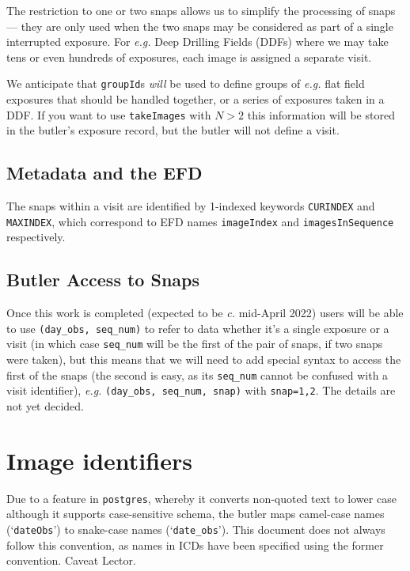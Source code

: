 \documentclass[SE,authoryear,toc]{lsstdoc}
\renewcommand{\eg}{\textit{e.g.}\xspace}
\begin{document}
The restriction to one or two snaps allows us to simplify the
processing of snaps --- they are only used when the two snaps may be considered as part
of a single interrupted exposure. For \eg Deep Drilling Fields (DDFs) where we may take tens
or even hundreds of exposures, each image is assigned a separate visit.

We anticipate that \texttt{groupId}s \textit{will} be used to define groups of \eg flat field
exposures that should be handled together, or a series of exposures taken in a DDF.  If you
want to use \texttt{takeImages} with $N > 2$ this information will be stored in the butler's
exposure record, but the butler will not define a visit.

\subsection{Metadata and the EFD}

The snaps within a visit are identified by 1-indexed keywords \texttt{CURINDEX} and \texttt{MAXINDEX},
which correspond to EFD names \texttt{imageIndex} and \texttt{imagesInSequence} respectively.

\subsection{Butler Access to Snaps}

Once this work is completed (expected to be \textit{c.} mid-April 2022) users will be able to use
\texttt{(day\_obs, seq\_num)} to refer to data whether it's a single exposure or a visit
(in which case \texttt{seq\_num} will be the first of the pair of snaps, if two snaps were taken), but
this means that we will need to add special syntax to access the first of the snaps (the second is easy,
as its \texttt{seq\_num} cannot be confused with a visit identifier), \eg
\texttt{(day\_obs, seq\_num, snap)} with \texttt{snap=1,2}.  The details are not yet decided.

\section{Image identifiers}
\label{sec:imageIdentifiers}

Due to a feature in \texttt{postgres}, whereby it converts non-quoted text to lower case although
it supports case-sensitive schema, the butler maps camel-case names (`\texttt{dateObs}') to snake-case
names (`\texttt{date\_obs}').  This
document does not always follow this convention, as names in ICDs have been specified using
the former convention.  Caveat Lector.
\end{document}
